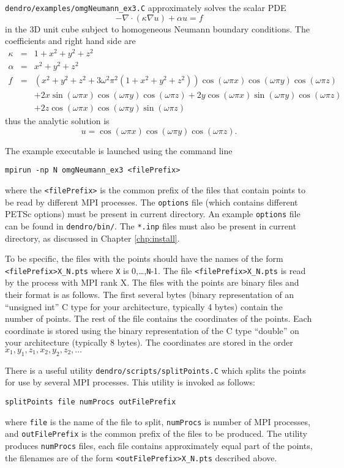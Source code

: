 \documentclass[12pt,reqno,a4paper]{report}
\numberwithin{equation}{section}
\newcommand{\dive}{{\nabla}\cdot}
\begin{document}
\verb'dendro/examples/omgNeumann_ex3.C' approximately solves the scalar PDE
\begin{equation*}
-\dive\left(\kappa \nabla u\right) + \alpha u  = f %
\end{equation*}
in the 3D unit cube subject to homogeneous Neumann boundary conditions. The coefficients and right hand side are 
\begin{eqnarray*}
\kappa &=&  1+ x^2+y^2+z^2  \\
\alpha &=&  x^2+y^2+z^2     \\
f      &=&  (x^2+y^2+z^2 + 3\omega^2\pi^2(1+x^2+y^2+z^2)) \cos(\omega\pi x) \cos(\omega\pi y)\cos(\omega\pi z)  \\
&& +2x \sin(\omega\pi x) \cos(\omega\pi y)\cos(\omega\pi z) + 2y \cos(\omega\pi x) \sin(\omega\pi y)\cos(\omega\pi z)\\
&& + 2z \cos(\omega\pi x) \cos(\omega\pi y)\sin(\omega\pi z)
\end{eqnarray*}
thus the analytic solution is
\[
u=\cos(\omega\pi x) \cos(\omega\pi y)\cos(\omega\pi z).
\]

The example executable is launched using the command line
\begin{verbatim}
mpirun -np N omgNeumann_ex3 <filePrefix>
\end{verbatim}
where the \verb|<filePrefix>| is the common prefix of the files that contain points to be read by different 
MPI processes. The \verb'options' file (which contains different PETSc options) must be present in current directory. An example \verb'options' file can be found in \verb'dendro/bin/'. The \verb'*.inp' files must also be present in current directory, as discussed in Chapter \ref{chp:install}.

To be specific, the files with the points should have the names of the form \verb?<filePrefix>X_N.pts? where \verb?X? is 0,\dots,\verb|N|-1. The file \verb?<filePrefix>X_N.pts? is read by the process with MPI rank X. The files with the points are binary files and their format is as follows. The first several bytes (binary representation of an ``unsigned int'' C type for your architecture, typically 4 bytes) contain the number of points. The rest of the file contains the coordinates of the points. Each coordinate is stored using the binary representation of the C type ``double'' on your architecture (typically 8 bytes). The coordinates are stored in the order $x_1,y_1,z_1,x_2,y_2,z_2,\ldots$

There is a useful utility \verb'dendro/scripts/splitPoints.C' which splits the points for use by several MPI processes. This utility is invoked as follows:
\begin{verbatim}
splitPoints file numProcs outFilePrefix
\end{verbatim}
where \verb|file| is the name of the file to split, \verb|numProcs| is number of MPI processes, and  \verb|outFilePrefix| is the common prefix of the files to be produced. The utility produces \verb|numProcs| files, each file contains approximately equal part of the points, the filenames are of the form \verb?<outFilePrefix>X_N.pts? described above.
\end{document}

